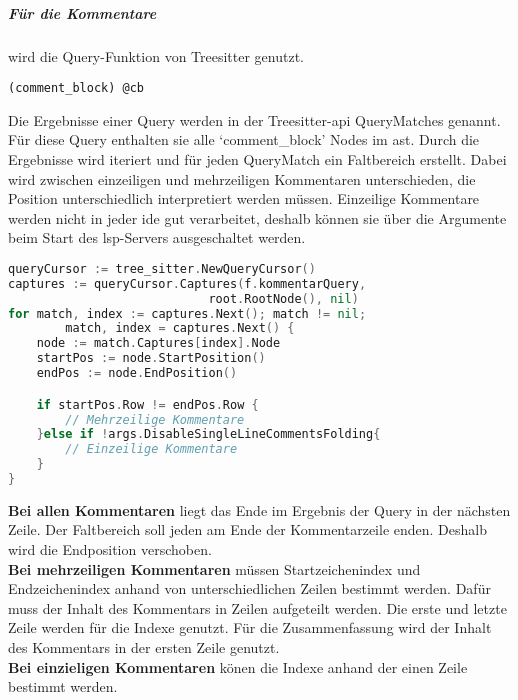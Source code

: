 \documentclass[./einleitung.tex]{subfiles}
\begin{document}
    \subparagraph{Für die Kommentare} wird die Query-Funktion von Treesitter genutzt.
    \begin{lstlisting}[capture=Die Query für alle Kommentare, label=lst:commentQuery]
(comment_block) @cb
    \end{lstlisting}
    Die Ergebnisse einer Query werden in der Treesitter-\acrshort{api} QueryMatches genannt.
    Für diese Query enthalten sie alle `comment_block' Nodes im \acrshort{ast}.
    Durch die Ergebnisse wird iteriert und für jeden QueryMatch ein Faltbereich erstellt.
    Dabei wird zwischen einzeiligen und mehrzeiligen Kommentaren unterschieden, die Position unterschiedlich interpretiert werden müssen.
    Einzeilige Kommentare werden nicht in jeder \acrshort{ide} gut verarbeitet, deshalb können sie über die Argumente beim Start des \acrshort{lsp}-Servers ausgeschaltet werden.
    \begin{lstlisting}[language=Go, caption=Auszug aus der Bestimmung der Faltbereiche für die Kommentare, label=lst:foldingCommentsFor]
queryCursor := tree_sitter.NewQueryCursor()
captures := queryCursor.Captures(f.kommentarQuery,
                            root.RootNode(), nil)
for match, index := captures.Next(); match != nil;
        match, index = captures.Next() {
    node := match.Captures[index].Node
    startPos := node.StartPosition()
    endPos := node.EndPosition()

    if startPos.Row != endPos.Row {
        // Mehrzeilige Kommentare
    }else if !args.DisableSingleLineCommentsFolding{
        // Einzeilige Kommentare
    }
}
    \end{lstlisting}
    \textbf{Bei allen Kommentaren} liegt das Ende im Ergebnis der Query in der nächsten Zeile.
    Der Faltbereich soll jeden am Ende der Kommentarzeile enden.
    Deshalb wird die Endposition verschoben.\\
    \textbf{Bei mehrzeiligen Kommentaren} müssen Startzeichenindex und Endzeichenindex anhand von unterschiedlichen Zeilen bestimmt werden.
    Dafür muss der Inhalt des Kommentars in Zeilen aufgeteilt werden.
    Die erste und letzte Zeile werden für die Indexe genutzt.
    Für die Zusammenfassung wird der Inhalt des Kommentars in der ersten Zeile genutzt.\\
    \textbf{Bei einzieligen Kommentaren} könen die Indexe anhand der einen Zeile bestimmt werden.
\end{document}
